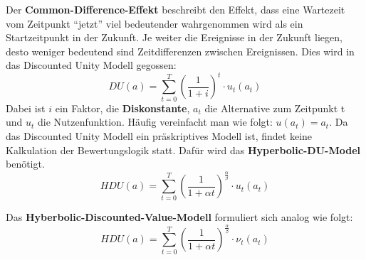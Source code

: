 Der \textbf{Common-Difference-Effekt} beschreibt den Effekt, dass
eine Wartezeit vom Zeitpunkt ``jetzt'' viel bedeutender wahrgenommen wird
als ein Startzeitpunkt in der Zukunft. Je weiter die Ereignisse in der Zukunft
liegen, desto weniger bedeutend sind Zeitdifferenzen zwischen Ereignissen.
Dies wird in das Discounted Unity Modell gegossen:
\begin{equation}
        DU(a) = \sum_{t=0}^T (\frac{1}{1+i})^t \cdot u_t(a_t)
\end{equation}
Dabei ist $i$ ein Faktor, die \textbf{Diskonstante}, $a_t$ die Alternative
zum Zeitpunkt t und $u_t$ die Nutzenfunktion. Häufig vereinfacht man wie folgt:
$u(a_t) = a_t$. Da das Discounted Unity Modell ein präskriptives Modell ist,
findet keine Kalkulation der Bewertungslogik statt. Dafür wird das
\textbf{Hyperbolic-DU-Model} benötigt.
\begin{equation}
    HDU(a) = \sum_{t=0}^T (\frac{1}{1+\alpha t})^{\frac{\alpha}{\beta}} \cdot u_t(a_t)
\end{equation}

Das \textbf{Hyberbolic-Discounted-Value-Modell} formuliert sich analog wie folgt:
\begin{equation}
    HDU(a) = \sum_{t=0}^T (\frac{1}{1+\alpha t})^{\frac{\alpha}{\beta}} \cdot \nu_t(a_t)
\end{equation}
